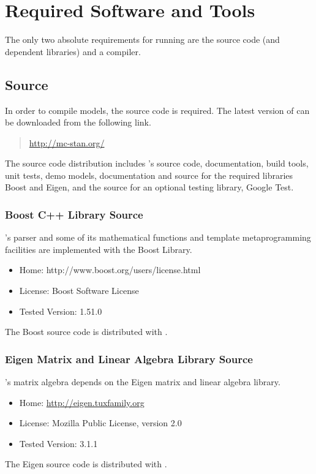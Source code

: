 \section{Required Software and Tools}

The only two absolute requirements for running \Stan are the
\Stan source code (and dependent libraries) and a \Cpp compiler.

\subsection{\Stan Source}

In order to compile \Stan models, the \Stan source code is required.
The latest version of \Stan can be downloaded from the following link.
%
\begin{quote}
\url{http://mc-stan.org/}
\end{quote}
%
The \Stan source code distribution includes \Stan's source code,
documentation, build tools, unit tests, demo models, documentation and
source for the required libraries Boost and Eigen, and the source for
an optional testing library, Google Test.

\subsubsection{Boost C++ Library Source}

\Stan's parser and some of its mathematical functions and 
template metaprogramming facilities are implemented with the Boost
\Cpp Library.  
%
\begin{itemize}
\item Home: http://www.boost.org/users/license.html
\item License: Boost Software License
\item Tested Version: 1.51.0
\end{itemize}
%
The Boost source code is distributed with \Stan.


\subsubsection{Eigen Matrix and Linear Algebra Library Source}

\Stan's matrix algebra depends on the Eigen \Cpp matrix and linear
algebra library.  
%
\begin{itemize}
\item Home: \url{http://eigen.tuxfamily.org}
\item License: Mozilla Public License, version 2.0
\item Tested Version: 3.1.1
\end{itemize}
%
The Eigen source code is distributed with \Stan.



